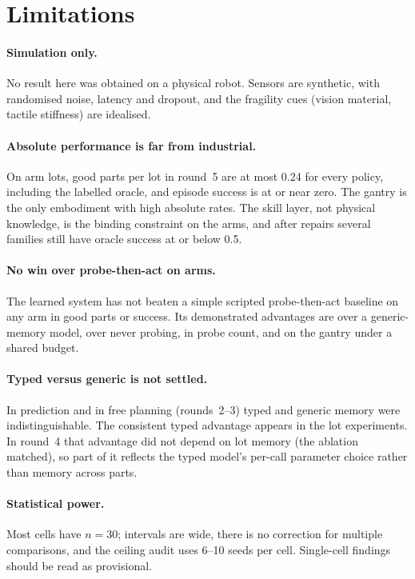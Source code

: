 \section{Limitations}
\label{sec:limitations}

\paragraph{Simulation only.} No result here was obtained on a physical robot. Sensors are synthetic, with
randomised noise, latency and dropout, and the fragility cues (vision material, tactile stiffness) are idealised.

\paragraph{Absolute performance is far from industrial.} On arm lots, good parts per lot in round~5 are at most 0.24 for
every policy, including the labelled oracle, and episode success is at or near zero. The gantry is
the only embodiment with high absolute rates. The skill layer, not physical knowledge, is the binding
constraint on the arms, and after repairs several families still have oracle success at or below 0.5.

\paragraph{No win over probe-then-act on arms.} The learned system has not beaten a simple scripted
probe-then-act baseline on any arm in good parts or success. Its demonstrated advantages are over a
generic-memory model, over never probing, in probe count, and on the gantry under a shared budget.

\paragraph{Typed versus generic is not settled.} In prediction and in free planning (rounds~2--3) typed and
generic memory were indistinguishable. The consistent typed advantage appears in the lot experiments. In
round~4 that advantage did not depend on lot memory (the ablation matched), so part of it reflects the typed
model's per-call parameter choice rather than memory across parts.

\paragraph{Statistical power.} Most cells have $n = 30$; intervals are wide, there is no correction for
multiple comparisons, and the ceiling audit uses 6--10 seeds per cell. Single-cell findings should be read as
provisional.

